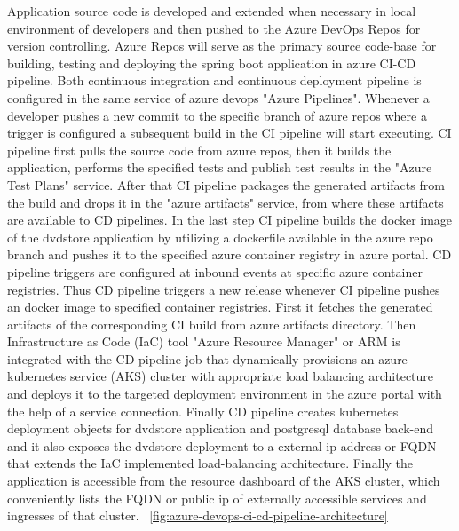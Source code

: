 Application source code is developed and extended when necessary in local environment of developers and then pushed to the Azure DevOps Repos for version controlling. Azure Repos will serve as the primary source code-base for building, testing and deploying the spring boot application in azure CI-CD pipeline. Both continuous integration and continuous deployment pipeline is configured in the same service of azure devops "Azure Pipelines". Whenever a developer pushes a new commit to the specific branch of azure repos where a trigger is configured a subsequent build in the CI pipeline will start executing. CI pipeline first pulls the source code from azure repos, then it builds the application, performs the specified tests and publish test results in the "Azure Test Plans" service. After that CI pipeline packages the generated artifacts from the build and drops it in the "azure artifacts" service, from where these artifacts are available to CD pipelines. In the last step CI pipeline builds the docker image of the dvdstore application by utilizing a dockerfile available in the azure repo branch and pushes it to the specified azure container registry in azure portal. CD pipeline triggers are configured at inbound events at specific azure container registries. Thus CD pipeline triggers a new release whenever CI pipeline pushes an docker image to specified container registries. First it fetches the generated artifacts of the corresponding CI build from azure artifacts directory. Then Infrastructure as Code (IaC) tool "Azure Resource Manager" or ARM is integrated with the CD pipeline job that dynamically provisions an azure kubernetes service (AKS) cluster with appropriate load balancing architecture and deploys it to the targeted deployment environment in the azure portal with the help of a service connection. Finally CD pipeline creates kubernetes deployment objects for dvdstore application and postgresql database back-end and it also exposes the dvdstore deployment to a external ip address or FQDN that extends the IaC implemented load-balancing architecture. Finally the application is accessible from the resource dashboard of the AKS cluster, which conveniently lists the FQDN or public ip of externally accessible services and ingresses of that cluster. ~\ref{fig:azure-devops-ci-cd-pipeline-architecture} 
